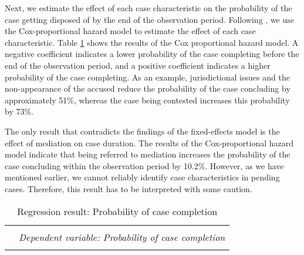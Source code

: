\documentclass[12pt,a4paper]{article}
\begin{document}
\begin{appendices}
		
		Next, we estimate the effect of each case characteristic on the probability of the case getting disposed of by the end of the observation period. Following \textcite{datta2017_itatDelays}, we use the Cox-proportional hazard model to estimate the effect of each case characteristic. Table \ref{tab:survialProb} shows the results of the Cox proportional hazard model. A negative coefficient indicates a lower probability of the case completing before the end of the observation period, and a positive coefficient indicates a higher probability of the case completing. As an example, jurisdictional issues and the non-appearance of the accused reduce the probability of the case concluding by approximately 51\%, whereas the case being contested increases this probability by 73\%.
		
		The only result that contradicts the findings of the fixed-effects model is the effect of mediation on case duration. The results of the Cox-proportional hazard model indicate that being referred to mediation increases the probability of the case concluding within the observation period by 10.2\%. However, as we have mentioned earlier, we cannot reliably identify case characteristics in pending cases. Therefore, this result has to be interpreted with some caution.
	
	\newpage
	{\footnotesize
		\begin{longtable}[h]{lr}
			\caption{Regression result: Probability of case completion}\label{tab:survialProb}\\
			\\[-1.8ex] 
			\hline \\[-1.8ex] 
			& \multicolumn{1}{c}{\textit{Dependent variable: Probability of case completion}} \\ 
			\cline{2-2} 
			\hline \\[-1.8ex] 
			

\end{longtable}}
\end{appendices}
\end{document}
